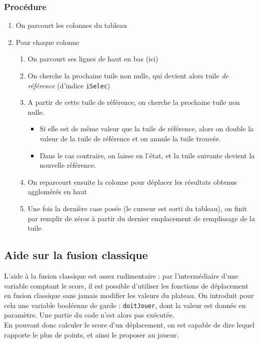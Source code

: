 \documentclass[12pt,a4paper]{article}
\begin{document}
\subsubsection*{Procédure}
\begin{enumerate}[label=\Alph* :]
\item On parcourt les colonnes du tableau
\item Pour chaque colonne
\begin{enumerate}[label=\arabic* :]
\item On parcourt ses lignes de haut en bas (ici)
\item On cherche la prochaine tuile non nulle, qui devient alors tuile \emph{de référence} (d'indice \texttt{iSelec})
\item A partir de cette tuile de référence, on cherche la prochaine tuile non nulle.
\begin{itemize}
\item Si elle est de même valeur que la tuile de référence, alors on double la valeur de la tuile de référence et on annule la tuile trouvée.
\item Dans le cas contraire, on laisse en l'état, et la tuile suivante devient la nouvelle référence.
\end{itemize}
\item On reparcourt ensuite la colonne pour déplacer les résultats obtenus agglomérés en haut
\item Une fois la dernière case posée (le curseur est sorti du tableau), on finit par remplir de zéros à partir du dernier emplacement de remplissage de la tuile 
\end{enumerate}
\end{enumerate}


\subsection{Aide sur la fusion classique}
L'aide à la fusion classique est assez rudimentaire : par l'intermédiaire d'une variable comptant le score, il est possible d'utiliser les fonctions de déplacement en fusion classique sans jamais modifier les valeurs du plateau. On introduit pour cela une variable booléenne de garde : \texttt{doitJouer}, dont la valeur est donnée en paramètre. Une partie du code n'est alors pas exécutée. \\
En pouvant donc calculer le score d'un déplacement, on est capable de dire lequel rapporte le plus de points, et ainsi le proposer au joueur.
\end{document}
